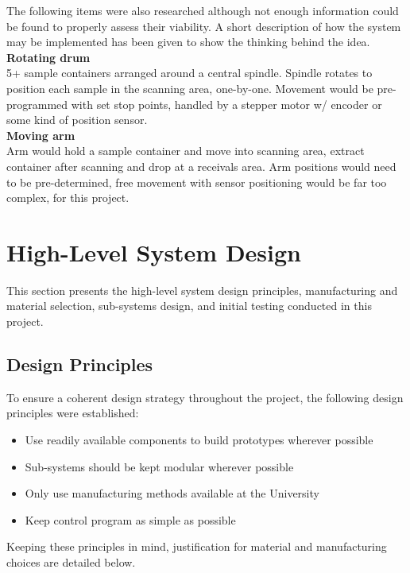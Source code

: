 \documentclass{UoNMCHA}
\numberwithin{equation}{section}
\begin{document}
The following items were also researched although not enough information could be found to properly assess their viability. A short description of how the system may be implemented has been given to show the thinking behind the idea.\\
\textbf{ Rotating drum}\\
5+ sample containers arranged around a central spindle. Spindle rotates to position each sample in the scanning area, one-by-one. Movement would be pre-programmed with set stop points, handled by a stepper motor w/ encoder or some kind of position sensor.\\
\textbf{Moving arm}\\
Arm would hold a sample container and move into scanning area, extract container after scanning and drop at a receivals area. Arm positions would need to be pre-determined, free movement with sensor positioning would be far too complex, for this project.\\
\newpage
\section{High-Level System Design}\label{sec:High-Level System Design}
This section presents the high-level system design principles, manufacturing and material selection, sub-systems design, and initial testing conducted in this project.\\

\subsection{Design Principles}\label{sub:Design Principles}
To ensure a coherent design strategy throughout the project, the following design principles were established:\\
\begin{itemize}
	\item Use readily available components to build prototypes wherever possible
	\item Sub-systems should be kept modular wherever possible
	\item Only use manufacturing methods available at the University
	\item Keep control program as simple as possible
\end{itemize}
Keeping these principles in mind, justification for material and manufacturing choices are detailed below. \\
\end{document}
